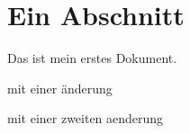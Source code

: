 \documentclass{scrartcl}
\begin{document}
\section{Ein Abschnitt}
Das ist mein erstes Dokument.

mit einer änderung

mit einer zweiten aenderung
\end{document}
